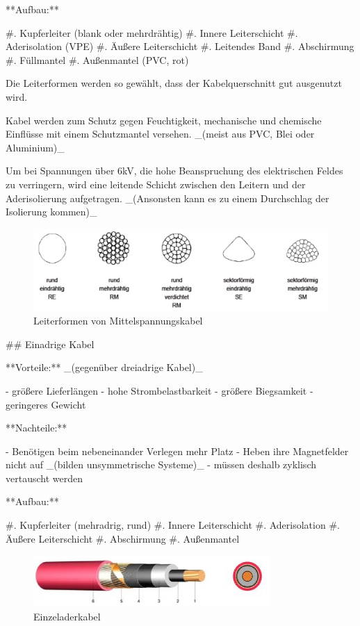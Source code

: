 \begin{markdown}
**Aufbau:**

#. Kupferleiter (blank oder mehrdrähtig)
#. Innere Leiterschicht
#. Aderisolation (VPE)
#. Äußere Leiterschicht
#. Leitendes Band
#. Abschirmung
#. Füllmantel
#. Außenmantel (PVC, rot)

Die Leiterformen werden so gewählt, dass der Kabelquerschnitt gut ausgenutzt wird. 

Kabel werden zum Schutz gegen Feuchtigkeit, mechanische und chemische Einflüsse mit einem Schutzmantel versehen. _(meist aus PVC, Blei oder Aluminium)_

Um bei Spannungen über 6kV, die hohe Beanspruchung des elektrischen Feldes zu verringern, wird eine leitende Schicht zwischen den Leitern und der Aderisolierung aufgetragen. _(Ansonsten kann es zu einem Durchschlag der Isolierung kommen)_

\begin{figure}[H]
    \includegraphics[width=\linewidth]{./images/09-Kabel/Mittelspannungskabel-Leiterformen.png}
    \caption[Leiterformen von Mittelspannungskabel]{Leiterformen von Mittelspannungskabel}
\end{figure}

\newpage

## Einadrige Kabel

**Vorteile:** _(gegenüber dreiadrige Kabel)_

- größere Lieferlängen
- hohe Strombelastbarkeit
- größere Biegsamkeit
- geringeres Gewicht 

**Nachteile:**

- Benötigen beim nebeneinander Verlegen mehr Platz 
- Heben ihre Magnetfelder nicht auf _(bilden unsymmetrische Systeme)_
    - müssen deshalb zyklisch vertauscht werden 

**Aufbau:**

#. Kupferleiter (mehradrig, rund)
#. Innere Leiterschicht
#. Aderisolation
#. Äußere Leiterschicht
#. Abschirmung
#. Außenmantel

\begin{figure}[H]
    \centering
    \includegraphics[width=0.8\textwidth]{./images/09-Kabel/Einzeladerkabel.png}
    \caption[Einzeladerkabel]{Einzeladerkabel}
\end{figure}


\end{markdown}
